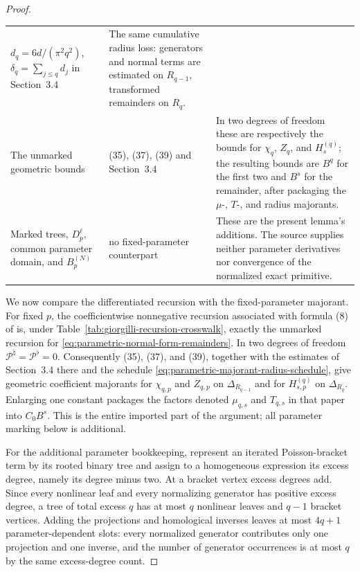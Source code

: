 \documentclass[11pt]{amsart}
\numberwithin{equation}{section}
\theoremstyle{definition}
\theoremstyle{remark}
\begin{document}
\begin{proof}
\begin{table}[tbp]
\begin{tabularx}{\textwidth}{>{\raggedright\arraybackslash}p{}
                             >{\raggedright\arraybackslash}p{}Y}
$d_q=6d/(\pi^2q^2)$, $\delta_q=\sum_{j\le q}d_j$ in Section~3.4 & The
same cumulative radius loss: generators and normal terms are estimated
on $R_{q-1}$, transformed remainders on $R_q$. \\
The unmarked geometric bounds & (35), (37), (39) and Section~3.4 & In two
degrees of freedom these are respectively the bounds for $\chi_q$,
$Z_q$, and $H_s^{(q)}$; the resulting bounds are $B^q$ for the first
two and $B^s$ for the remainder, after packaging the $\mu$-, $T$-, and
radius majorants. \\
Marked trees, $D_p^\ell$, common parameter domain, and
$B_p^{(N)}$ & no fixed-parameter counterpart & These are the present
lemma's additions.  The source supplies neither parameter derivatives
nor convergence of the normalized exact primitive. \\
\hline
\end{tabularx}
\end{table}

We now compare the differentiated recursion with the fixed-parameter
majorant.  For fixed $p$, the coefficientwise nonnegative recursion
associated with formula (8) of \cite{Giorgilli2001Unstable} is, under
Table~\ref{tab:giorgilli-recursion-crosswalk}, exactly the unmarked
recursion for \eqref{eq:parametric-normal-form-remainders}.  In two
degrees of freedom $\mathcal P^{\natural}=\mathcal P^{\flat}=0$.
Consequently (35), (37), and (39), together with the estimates of
Section~3.4 there and the schedule
\eqref{eq:parametric-majorant-radius-schedule}, give geometric
coefficient majorants for $\chi_{q,p}$ and $Z_{q,p}$ on
$\Delta_{R_{q-1}}$ and for $H_{s,p}^{(q)}$ on $\Delta_{R_q}$.  Enlarging
one constant packages the factors denoted $\mu_{q,s}$ and $T_{q,s}$ in
that paper into $C_0B^s$.  This is the entire imported part of the
argument; all parameter marking below is additional.

For the additional parameter bookkeeping, represent an iterated
Poisson-bracket term by its rooted binary tree and assign to a homogeneous
expression its excess degree, namely its degree minus two.  At a bracket
vertex excess degrees add.  Since every nonlinear leaf and every
normalizing generator has positive excess degree, a tree of total excess
$q$ has at most $q$ nonlinear leaves and $q-1$ bracket vertices.  Adding
the projections and homological inverses leaves at most $4q+1$
parameter-dependent slots: every normalized generator contributes only one
projection and one inverse, and the number of generator occurrences is at
most $q$ by the same excess-degree count.


\end{proof}
\end{document}
